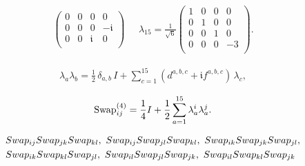 \documentclass[10pt,a4paper]{amsart}
\begin{document}
\begin{align*}
\begin{pmatrix}
		0 & 0 & 0 & 0 \\
		0 & 0 & 0 & -\mathfrak{i} \\
		0 & 0 & \mathfrak{i} & 0 \\
	\end{pmatrix}\ \quad \,
	\lambda_{15}= \frac{1}{\sqrt{6}}
		\begin{pmatrix}
			1 & 0 & 0 & 0 \\
			0 & 1 & 0 & 0 \\
			0 & 0 & 1 & 0 \\
			0 & 0 & 0 & -3 \\
		\end{pmatrix}.
\end{align*}

\begin{align}\label{eq: lambda4 x}
	\lambda_a \lambda_b = \frac{1}{2}\, \delta_{a,b}\,I + \sum_{c=1}^{15} (d^{a,b,c} + \mathfrak{i}f^{a,b,c}) \, \lambda_c, 
\end{align}

\begin{align}\label{eq: sw-gm 4}
	\text{\textnormal{Swap}}^{(4)}_{ij}= \frac{1}{4} I + \frac{1}{2} \sum_{a=1}^{15} \lambda_a^i \lambda_a^j.
\end{align}

\begin{equation}\label{eq: cubics}
	\begin{split}
&\textnormal{Swap}_{ij} \textnormal{Swap}_{jk} \textnormal{Swap}_{kl}, \ 
\textnormal{Swap}_{ij} \textnormal{Swap}_{jl} \textnormal{Swap}_{kl},\ 
\textnormal{Swap}_{ik} \textnormal{Swap}_{jk} \textnormal{Swap}_{jl},\\
&\textnormal{Swap}_{ik} \textnormal{Swap}_{kl} \textnormal{Swap}_{jl},\ 
\textnormal{Swap}_{il} \textnormal{Swap}_{jl} \textnormal{Swap}_{jk},\
\textnormal{Swap}_{il} \textnormal{Swap}_{kl} \textnormal{Swap}_{jk}
 \end{split}
\end{equation}
\end{document}
